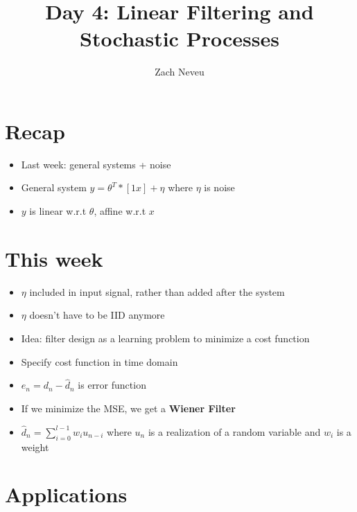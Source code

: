 \documentclass[12pt, letter]{article}
\author{Zach Neveu}
\title{ Day 4: Linear Filtering and Stochastic Processes}
\begin{document}
\maketitle

\section{Recap}%
\label{sec:recap}
\begin{itemize}
	\item Last week: general systems + noise
	\item General system $y=\theta^T*[1 x]+\eta$ where $\eta$ is noise
	\item $y$ is linear w.r.t $\theta$, affine w.r.t $x$
\end{itemize}

\section{This week}%
\label{sec:this_week}
\begin{itemize}
	\item $\eta$ included in input signal, rather than added after the system
	\item $\eta$ doesn't have to be IID anymore
	\item Idea: filter design as a learning problem to minimize a cost function
	\item Specify cost function in time domain
	\item $e_n = d_n - \hat{d}_n$ is error function
	\item If we minimize the MSE, we get a \textbf{Wiener Filter} 
	\item $\hat{d}_n = \sum_{i=0}^{l-1} w_iu_{n-i}$ where $u_n$ is a realization of a random variable and $w_i$ is a weight
\end{itemize}

\section{Applications}%
\label{sec:applications}
\end{document}

